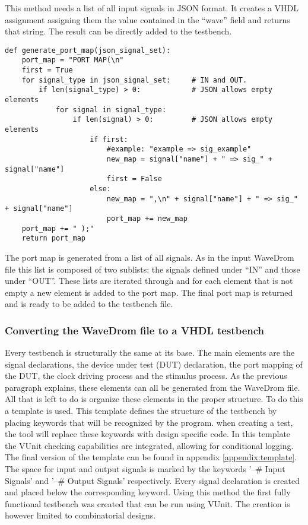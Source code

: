 This method needs a list of all input signals in JSON format. It creates a VHDL assignment assigning them the value contained in the “wave” field and returns that string. The result can be directly added to the testbench.\newpage
\begin{lstlisting}[style=python, caption={Generating a port map in Python}, label={
python:port_map}]
def generate_port_map(json_signal_set):
	port_map = "PORT MAP(\n"
	first = True
	for signal_type in json_signal_set:     # IN and OUT.
		if len(signal_type) > 0:            # JSON allows empty elements
			for signal in signal_type:
				if len(signal) > 0:         # JSON allows empty elements
					if first:
						#example: "example => sig_example"
						new_map = signal["name"] + " => sig_" + signal["name"]
						first = False
					else:
						new_map = ",\n" + signal["name"] + " => sig_" + signal["name"]
						port_map += new_map
	port_map += " );"
	return port_map
\end{lstlisting}\noindent
The port map is generated from a list of all signals. As in the input WaveDrom file this list is composed of two sublists: the signals defined under “IN” and those under “OUT”. These lists are iterated through and for each element that is not empty a new element is added to the port map. The final port map is returned and is ready to be added to the testbench file.
\subsubsection{Converting the WaveDrom file to a VHDL testbench}
Every testbench is structurally the same at its base. The main elements are the signal declarations, the device under test (DUT) declaration, the port mapping of the DUT, the clock driving process and the stimulus process. As the previous paragraph explains, these elements can all be generated from the WaveDrom file. All that is left to do is organize these elements in the proper structure. To do this a template is used. This template defines the structure of the testbench by placing keywords that will be recognized by the program. when creating a test, the tool will replace these keywords with design specific code. In this template the VUnit checking capabilities are integrated, allowing for conditional logging. The final version of the template can be found in appendix \ref{appendix:template}.
\newpage\noindent
The space for input and output signals is marked by the keywords '--\# Input Signals' and '--\# Output Signals' respectively. Every signal declaration is created and placed below the corresponding keyword. 
\npar
Using this method the first fully functional testbench was created that can be run using VUnit. The creation is however limited to combinatorial designs.
